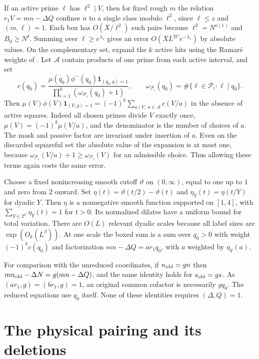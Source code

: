 \documentclass[11pt]{amsart}
\numberwithin{equation}{section}
\theoremstyle{remark}
\newcommand{\Z}{\mathbb Z}
\newcommand{\one}{\mathbf 1}
\begin{document}
If an active prime $\ell$ has $\ell^2\mid V$, then for fixed rough $m$ the relation $r_1V=mn-\Delta Q$ confines $n$ to a single class modulo $\ell^2$, since $\ell\le z$ and $(m,\ell)=1$. Each box has $O(X/\ell^2)$ such pairs because $\ell^2=N^{o(1)}$ and $B_0\ge N^\delta$. Summing over $\ell\ge e^{\lambda_1}$ gives an error $O(X L^{2C}e^{-\lambda_1})$ by absolute values. On the complementary set, expand the $k$ active hits using the Ramar\'e weights of \cite[Lemma~6.1]{Lichtman}. Let $\mathcal A$ contain products of one prime from each active interval, and set
\[
 c(q_0)=\frac{\mu(q_0)\phi^-(q_0)\one_{(q_0,g)=1}}
               {\prod_{i=1}^k(\omega_{\mathcal P_i}(q_0)+1)},
 \qquad \omega_{\mathcal P_i}(q_0)=\#\{\ell\in\mathcal P_i:\ell\mid q_0\} .
\]
Then $\mu(V)\phi(V)\one_{(V,g)=1}=(-1)^k\sum_{a\mid V,\ a\in\mathcal A}c(V/a)$ in the absence of active squares. Indeed all chosen primes divide $V$ exactly once, $\mu(V)=(-1)^k\mu(V/a)$, and the denominator is the number of choices of $a$. The mask and passive factor are invariant under insertion of $a$. Even on the discarded squareful set the absolute value of the expansion is at most one, because $\omega_{\mathcal P_i}(V/a)+1\ge\omega_{\mathcal P_i}(V)$ for an admissible choice. Thus allowing these terms again costs the same error.

Choose a fixed nonincreasing smooth cutoff $\vartheta$ on $(0,\infty)$, equal to one up to $1$ and zero from $2$ onward. Set $\eta(t)=\vartheta(t/2)-\vartheta(t)$ and $\eta_Y(t)=\eta(t/Y)$ for dyadic $Y$. Then $\eta$ is a nonnegative smooth function supported on $[1,4]$, with $\sum_{Y\in 2^\Z}\eta_Y(t)=1$ for $t>0$. Its normalized dilates have a uniform bound for total variation. There are $O(L)$ relevant dyadic scales because all label sizes are $\exp(O_k(L^\beta))$. At one scale the boxed sum is a sum over $q_0>0$ with weight $(-1)^kc(q_0)$ and factorization $mn-\Delta Q=ar_1q_0$, with $a$ weighted by $\eta_Y(a)$.

For comparison with the unreduced coordinates, if $n_{\rm old}=gn$ then $mn_{\rm old}-\Delta N=g(mn-\Delta Q)$, and the same identity holds for $s_{\rm old}=gs$. As $(ar_1,g)=(br_1,g)=1$, an original common cofactor is necessarily $gq_0$. The reduced equations use $q_0$ itself. None of these identities requires $(\Delta,Q)=1$.

\section{The physical pairing and its deletions}\label{sec:pairing}
\end{document}

